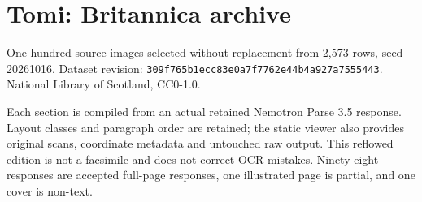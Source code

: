 \documentclass[10pt,a4paper]{article}
\begin{document}
\section*{Tomi: Britannica archive}
One hundred source images selected without replacement from 2,573 rows, seed 20261016. Dataset revision: \texttt{309f765b1ecc83e0a7f7762e44b4a927a7555443}. National Library of Scotland, CC0-1.0.\par
Each section is compiled from an actual retained Nemotron Parse 3.5 response. Layout classes and paragraph order are retained; the static viewer also provides original scans, coordinate metadata and untouched raw output. This reflowed edition is not a facsimile and does not correct OCR mistakes. Ninety-eight responses are accepted full-page responses, one illustrated page is partial, and one cover is non-text.\par































































\end{document}
